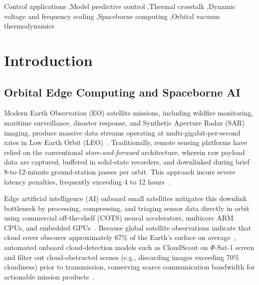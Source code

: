 \documentclass[a4paper,fleqn]{cas-dc}
\begin{document}
\begin{abstract}
$T_{\max}$ (Spearman $\rho = +0.995$). Indicative reliability proxy analyses demonstrate that electromigration yields no net life extension (relative Black damage ratios of 0.97 and 0.83), whereas cyclic thermal stress severity is substantially damped. The reported evidence is limited to numerical simulation of the stated lumped-parameter model and does not constitute hardware or flight qualification.
\end{abstract}

\begin{keywords}
Control applications \sep Model predictive control \sep Thermal crosstalk \sep Dynamic voltage and frequency scaling \sep Spaceborne computing \sep Orbital vacuum thermodynamics
\end{keywords}

\maketitle

\section{Introduction}
\label{sec:intro}

\subsection{Orbital Edge Computing and Spaceborne AI}
Modern Earth Observation (EO) satellite missions, including wildfire monitoring, maritime surveillance, disaster response, and Synthetic Aperture Radar (SAR) imaging, produce massive data streams operating at multi-gigabit-per-second rates in Low Earth Orbit (LEO)~\citep{denby2020asplos, garrett2024taes, chen2026sagin, ortiz2024spirit}. Traditionally, remote sensing platforms have relied on the conventional \textit{store-and-forward} architecture, wherein raw payload data are captured, buffered in solid-state recorders, and downlinked during brief 8-to-12-minute ground-station passes per orbit. This approach incurs severe latency penalties, frequently exceeding 4 to 12 hours~\citep{denby2020asplos, garrett2024taes}.

Edge artificial intelligence (AI) onboard small satellites mitigates this downlink bottleneck by processing, compressing, and triaging sensor data directly in orbit using commercial off-the-shelf (COTS) neural accelerators, multicore ARM CPUs, and embedded GPUs~\citep{garrett2024taes, sherwood2003ase}. Because global satellite observations indicate that cloud cover obscures approximately 67\% of the Earth's surface on average~\citep{king2013spatial}, automated onboard cloud-detection models such as CloudScout on $\Phi$-Sat-1 screen and filter out cloud-obstructed scenes (e.g., discarding images exceeding 70\% cloudiness) prior to transmission, conserving scarce communication bandwidth for actionable mission products~\citep{giuffrida2021phisat1}.
\end{document}
